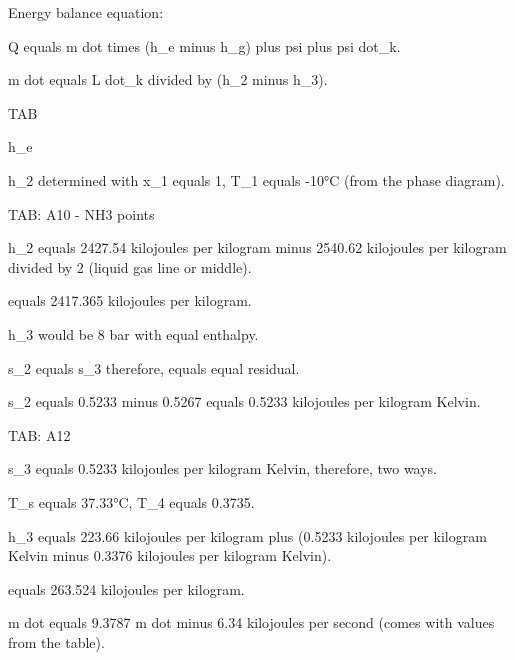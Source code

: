 Energy balance equation:

Q equals m dot times (h_e minus h_g) plus psi plus psi dot_k.

m dot equals L dot_k divided by (h_2 minus h_3).

TAB

h_e

h_2 determined with x_1 equals 1, T_1 equals -10°C (from the phase diagram).

TAB: A10 - NH3 points

h_2 equals 2427.54 kilojoules per kilogram minus 2540.62 kilojoules per kilogram divided by 2 (liquid gas line or middle).

equals 2417.365 kilojoules per kilogram.

h_3 would be 8 bar with equal enthalpy.

s_2 equals s_3 therefore, equals equal residual.

s_2 equals 0.5233 minus 0.5267 equals 0.5233 kilojoules per kilogram Kelvin.

TAB: A12

s_3 equals 0.5233 kilojoules per kilogram Kelvin, therefore, two ways.

T_s equals 37.33°C, T_4 equals 0.3735.

h_3 equals 223.66 kilojoules per kilogram plus (0.5233 kilojoules per kilogram Kelvin minus 0.3376 kilojoules per kilogram Kelvin).

equals 263.524 kilojoules per kilogram.

m dot equals 9.3787 m dot minus 6.34 kilojoules per second (comes with values from the table).